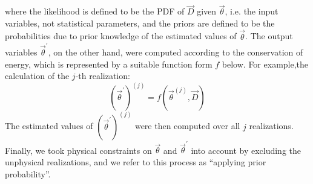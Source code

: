 where the likelihood is defined to be the PDF of $\vec{D}$ given $\vec{\theta}$,
i.e. the input variables, not statistical parameters, and the priors are
defined to be the probabilities due to prior knowledge of the estimated values of
$\vec{\theta}$. The output variables $\vec{\theta}^\prime$, on the other
hand, were computed according to the conservation of energy, which is represented by a suitable
function form $f$ below. For example,the calculation of the $j$-th realization: 
\begin{equation}
    (\vec{\theta}^\prime)^{(j)} = f(\vec{\theta}^{(j)}, \vec{D}) 
\end{equation}    
The estimated values of $(\vec{\theta}^\prime)^{(j)}$ were then computed
over all $j$ realizations. Finally, we took physical
constraints on $\vec{\theta}$ and $\vec{\theta}^\prime$ into account by
excluding the unphysical realizations, and we refer to this process as
``applying prior probability''. 

